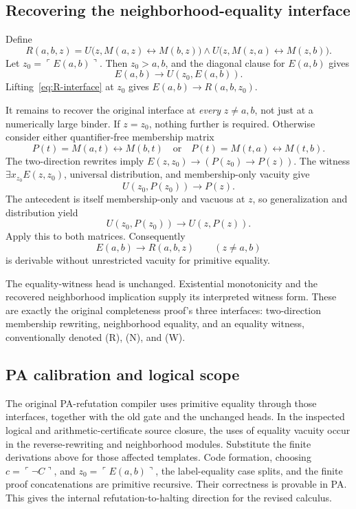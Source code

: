 \subsection{Recovering the neighborhood-equality interface}
Define
\[
 R(a,b,z)=U\bigl(z,M(a,z)\leftrightarrow M(b,z)\bigr)
 \wedge U\bigl(z,M(z,a)\leftrightarrow M(z,b)\bigr).
\]
Let \(z_0=\ulcorner E(a,b)\urcorner\). Then \(z_0>a,b\), and the diagonal clause for \(E(a,b)\) gives
\[
 E(a,b)\to U(z_0,E(a,b)).
\]
Lifting~\eqref{eq:R-interface} at \(z_0\) gives
\(E(a,b)\to R(a,b,z_0)\).

It remains to recover the original interface at \emph{every} \(z\ne a,b\), not just at a numerically large binder. If \(z=z_0\), nothing further is required. Otherwise consider either quantifier-free membership matrix
\[
 P(t)=M(a,t)\leftrightarrow M(b,t)
 \quad\text{or}\quad
 P(t)=M(t,a)\leftrightarrow M(t,b).
\]
The two-direction rewrites imply
\(E(z,z_0)\to(P(z_0)\to P(z))\). The witness
\(\exists x_{z_0}E(z,z_0)\), universal distribution, and membership-only vacuity give
\[
 U(z_0,P(z_0))\to P(z).
\]
The antecedent is itself membership-only and vacuous at \(z\), so generalization and distribution yield
\[
 U(z_0,P(z_0))\to U(z,P(z)).
\]
Apply this to both matrices. Consequently
\[
 E(a,b)\to R(a,b,z)\qquad(z\ne a,b)
\]
is derivable without unrestricted vacuity for primitive equality.

The equality-witness head is unchanged. Existential monotonicity and the recovered neighborhood implication supply its interpreted witness form. These are exactly the original completeness proof's three interfaces: two-direction membership rewriting, neighborhood equality, and an equality witness, conventionally denoted (R), (N), and (W).

\subsection{PA calibration and logical scope}
The original PA-refutation compiler uses primitive equality through those interfaces, together with the old gate and the unchanged heads. In the inspected logical and arithmetic-certificate source closure, the uses of equality vacuity occur in the reverse-rewriting and neighborhood modules. Substitute the finite derivations above for those affected templates. Code formation, choosing \(c=\ulcorner\neg C\urcorner\), and \(z_0=\ulcorner E(a,b)\urcorner\), the label-equality case splits, and the finite proof concatenations are primitive recursive. Their correctness is provable in PA. This gives the internal refutation-to-halting direction for the revised calculus.

